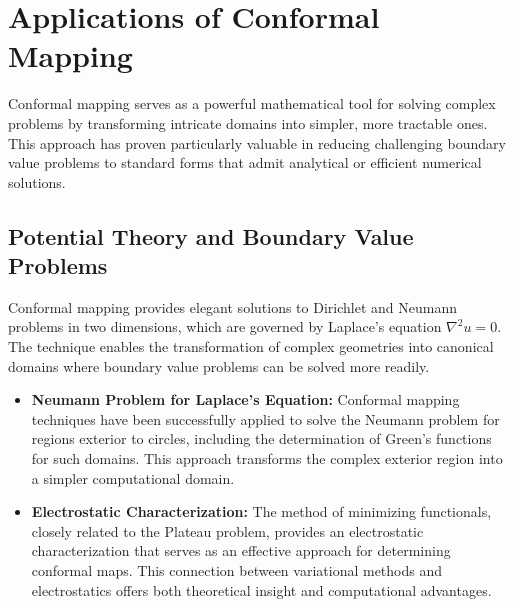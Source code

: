 \documentclass[12pt,a4paper]{article}
\providecommand{\tightlist}{%
  \setlength{\itemsep}{0pt}\setlength{\parskip}{0pt}}
\begin{document}
\newpage
\section{Applications of Conformal Mapping}\label{applications-of-conformal-mapping}

Conformal mapping serves as a powerful mathematical tool for solving complex problems by transforming intricate domains into simpler, more tractable ones. This approach has proven particularly valuable in reducing challenging boundary value problems to standard forms that admit analytical or efficient numerical solutions.

\subsection{Potential Theory and Boundary Value Problems}\label{potential-theory-and-boundary-value-problems}

Conformal mapping provides elegant solutions to Dirichlet and Neumann problems in two dimensions, which are governed by Laplace's equation \(\nabla^2 u = 0\). The technique enables the transformation of complex geometries into canonical domains where boundary value problems can be solved more readily.

\begin{itemize}
\tightlist
\item
  \textbf{Neumann Problem for Laplace's Equation:} Conformal mapping techniques have been successfully applied to solve the Neumann problem for regions exterior to circles, including the determination of Green's functions for such domains. This approach transforms the complex exterior region into a simpler computational domain.

\item
  \textbf{Electrostatic Characterization:} The method of minimizing functionals, closely related to the Plateau problem, provides an electrostatic characterization that serves as an effective approach for determining conformal maps. This connection between variational methods and electrostatics offers both theoretical insight and computational advantages.
\end{itemize}
\end{document}
